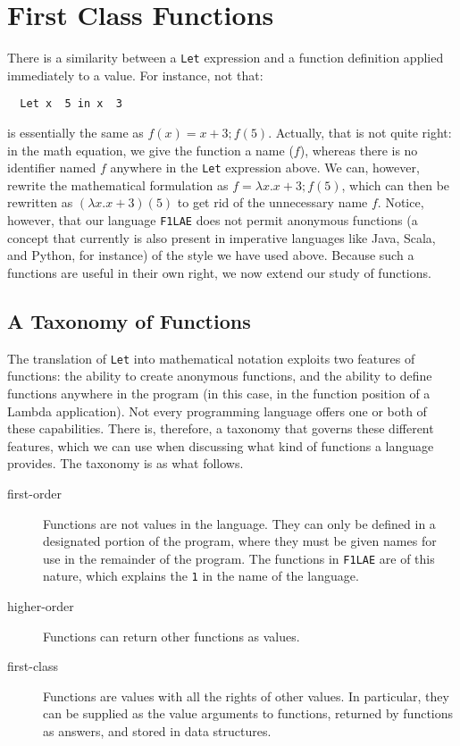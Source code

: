 \documentclass{book}
\begin{document}
\section{First Class Functions} 

There is a similarity between a \texttt{Let} expression 
and a function definition applied immediately to a value. 
For instance, not that: 

\begin{tabbing}\tt
~Let~x~~5~in~x~~3
\end{tabbing}

\noindent is essentially the same as $f(x) = x + 3; f(5)$. Actually, 
that is not quite right: in the math equation, we give the function 
a name ($f$), whereas there is no identifier named $f$ anywhere 
in the \texttt{Let} expression above. We can, however, rewrite 
the mathematical formulation as $f = \lambda x . x + 3; f(5)$, 
which can then be rewritten as $(\lambda x . x + 3)(5)$ to get 
rid of the unnecessary name $f$. Notice, however, that our 
language \texttt{F1LAE} does not permit anonymous functions 
(a concept that currently is also present in 
imperative languages like Java, Scala, and Python, for instance) 
of the style we have used above. Because such a functions 
are useful in their own right, we now extend our study of 
functions. 

\subsection{A Taxonomy of Functions} 

The translation of \texttt{Let} into mathematical 
notation exploits two features of functions: the 
ability to create anonymous functions, and the ability 
to define functions anywhere in the program (in this case, 
in the function position of a Lambda application). Not 
every programming language offers one or both of these 
capabilities. There is, therefore, a taxonomy that 
governs these different features, which we can use 
when discussing what kind of functions a language 
provides. The taxonomy is as what follows.

\begin{description}
\item [first-order] Functions are not values in the language. They 
can only be defined in a designated portion of the program, where 
they must be given names for use in the remainder of the program. The 
functions in \texttt{F1LAE} are of this nature, which explains the 
\texttt{1} in the name of the language. 

\item [higher-order] Functions can return other functions as values. 

\item [first-class] Functions are values with all the rights of 
other values. In particular, they can be supplied as the value 
arguments to functions, returned by functions as answers, and 
stored in data structures. 

\end{description}
\end{document}
